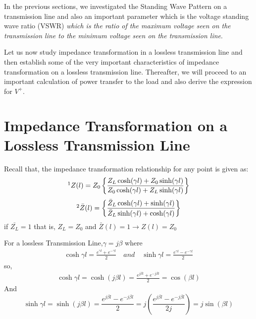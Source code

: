 In the previous sections, we investigated the Standing Wave Pattern on a transmission line and also an important parameter which is the voltage standing wave ratio (VSWR) \emph{which is the ratio of the maximum voltage seen on the transmission line to the minimum voltage seen on the transmission line}.

Let us now study impedance transformation in a lossless transmission line and then establish some of the very important characteristics of impedance transformation on a lossless transmission line. Thereafter, we will proceed to an important calculation of power transfer to the load and also derive the expression for $V^{+}$.

\section{Impedance Transformation on a Lossless Transmission Line}\label{lec:lec6}
Recall that, the impedance transformation relationship for any point is given as:
\begin{align*}
\footnotemark[1]Z(l) = Z_0\left\lbrace \frac{Z_L\cosh(\gamma l) + Z_0\sinh(\gamma l)}{Z_0\cosh(\gamma l) + Z_L\sinh(\gamma l)}\right\rbrace 
\end{align*}
\begin{align*}
\footnotemark[2]\bar{Z}(l) = \left\lbrace \frac{\bar{Z}_L\cosh(\gamma l) + \sinh(\gamma l)}{\bar{Z}_L\sinh(\gamma l) + \cosh(\gamma l)}\right\rbrace 
\end{align*}
if $\bar{Z_L} = 1$ that is, $Z_L = Z_0$ and $\bar{Z}(l) = 1 \rightarrow Z(l) = Z_0$

For a lossless Transmission Line,$\gamma=j\beta$ where
\begin{align*}
\cosh\gamma l = \frac{e^{\gamma l} + e^{-\gamma l}}{2} \quad and \quad \sinh\gamma l = \frac{e^{\gamma l} - e^{-\gamma l}}{2}
\end{align*}
so,
\begin{align*}
\cosh\gamma l= \cosh(j\beta l)=\frac{e^{j \beta l} + e^{-j \beta l}}{2}=\cos(\beta l)
\end{align*}
And
\begin{dmath*}
\sinh\gamma l=\sinh(j\beta l) = \frac{e^{j \beta l}-e^{-j\beta l}}{2} = j\left( \frac{e^{j\beta l}-e^{-j\beta l}}{2j}\right) =j\sin(\beta l)
\end{dmath*}

